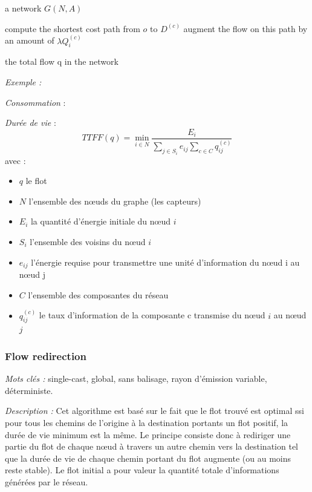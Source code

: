 \begin{algorithm}[H]
\caption{$FA(x_1,x_2,x_3)$}
\label{algo_FA}
\begin{algorithmic}
\REQUIRE a network $ G(N,A) $

			\STATE compute the shortest cost path from $o$ to $D^{(c)}$
			\STATE augment the flow on this path by an amount of $\lambda Q_i^{(c)}$
		\ENDFOR
	\ENDFOR
\ENDWHILE

\RETURN the total flow q in the network
\end{algorithmic}
\end{algorithm}

\emph{Exemple :} %

\emph{Consommation} : 

\emph{Durée de vie} :  $$TTFF(q) = \min\limits_{i \in N}\frac{E_i}{\sum \limits_{j \in S_i} {e_{ij}} \sum \limits_{c \in C} {q_{ij}^{(c)}}}$$
avec :
\begin{itemize}
\item $q$ le flot
\item $N$ l'ensemble des nœuds du graphe (les capteurs)
\item $E_i$ la quantité d'énergie initiale du nœud $i$
\item $S_i$ l'ensemble des voisins du nœud $i$
\item $e_{ij}$ l'énergie requise pour transmettre une unité d'information du nœud i au nœud j
\item $C$ l'ensemble des composantes du réseau
\item $q_{ij}^{(c)}$ le taux d'information de la composante c transmise du nœud $i$ au nœud $j$
\end{itemize}



\subsubsection{Flow redirection \cite{Chang2000}}
\emph{Mots clés :} single-cast, global, sans balisage, rayon d'émission variable, déterministe.

\emph{Description :}
Cet algorithme est basé sur le fait que le flot trouvé est optimal ssi pour tous les chemins de l'origine à la destination portants un flot positif, la durée de vie minimum est la même. Le principe consiste donc à rediriger une partie du flot de chaque nœud à travers un autre chemin vers la destination tel que la durée de vie de chaque chemin portant du flot augmente (ou au moins reste stable). Le flot initial a pour valeur la quantité totale d'informations générées par le réseau.

